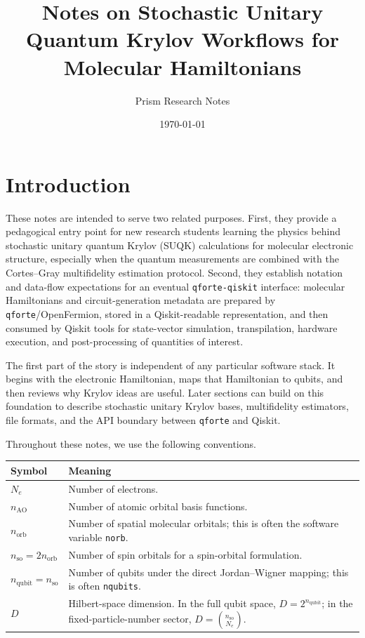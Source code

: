 \documentclass[11pt]{article}
\title{Notes on Stochastic Unitary Quantum Krylov Workflows for Molecular Hamiltonians}
\author{Prism Research Notes}
\date{\today}
\begin{document}
\maketitle

\section{Introduction}

These notes are intended to serve two related purposes.  First, they provide a pedagogical entry point for new research students learning the physics behind stochastic unitary quantum Krylov (SUQK) calculations for molecular electronic structure, especially when the quantum measurements are combined with the Cortes--Gray multifidelity estimation protocol.  Second, they establish notation and data-flow expectations for an eventual \texttt{qforte-qiskit} interface: molecular Hamiltonians and circuit-generation metadata are prepared by \texttt{qforte}/OpenFermion, stored in a Qiskit-readable representation, and then consumed by Qiskit tools for state-vector simulation, transpilation, hardware execution, and post-processing of quantities of interest.

The first part of the story is independent of any particular software stack.  It begins with the electronic Hamiltonian, maps that Hamiltonian to qubits, and then reviews why Krylov ideas are useful.  Later sections can build on this foundation to describe stochastic unitary Krylov bases, multifidelity estimators, file formats, and the API boundary between \texttt{qforte} and Qiskit.

Throughout these notes, we use the following conventions.
\begin{center}
\begin{tabular}{|l|p{}|}
\hline
Symbol & Meaning \\
\hline
$N_e$ & Number of electrons. \\
$n_{\mathrm{AO}}$ & Number of atomic orbital basis functions. \\
$n_{\mathrm{orb}}$ & Number of spatial molecular orbitals; this is often the software variable \texttt{norb}. \\
$n_{\mathrm{so}}=2n_{\mathrm{orb}}$ & Number of spin orbitals for a spin-orbital formulation. \\
$n_{\mathrm{qubit}}=n_{\mathrm{so}}$ & Number of qubits under the direct Jordan--Wigner mapping; this is often \texttt{nqubits}. \\
$D$ & Hilbert-space dimension.  In the full qubit space, $D=2^{n_{\mathrm{qubit}}}$; in the fixed-particle-number sector, $D=\binom{n_{\mathrm{so}}}{N_e}$. \\
\hline
\end{tabular}
\end{center}
\end{document}

